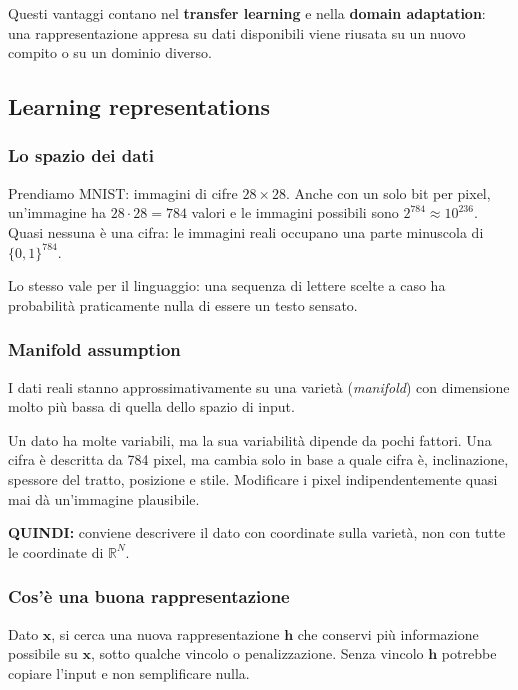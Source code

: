 \documentclass[11pt,a4paper]{article}
\begin{document}
Questi vantaggi contano nel \textbf{transfer learning} e nella
\textbf{domain adaptation}: una rappresentazione appresa su dati disponibili
viene riusata su un nuovo compito o su un dominio diverso.

\subsection{Learning representations}

\subsubsection{Lo spazio dei dati}
Prendiamo MNIST: immagini di cifre $28\times 28$. Anche con un solo bit per
pixel, un'immagine ha $28\cdot 28=784$ valori e le immagini possibili sono
$2^{784}\approx 10^{236}$. Quasi nessuna è una cifra: le immagini reali
occupano una parte minuscola di $\{0,1\}^{784}$.

Lo stesso vale per il linguaggio: una sequenza di lettere scelte a caso ha
probabilità praticamente nulla di essere un testo sensato.

\subsubsection{Manifold assumption}
\begin{definizione}
I dati reali stanno approssimativamente su una varietà (\emph{manifold}) con
dimensione molto più bassa di quella dello spazio di input.
\end{definizione}

Un dato ha molte variabili, ma la sua variabilità dipende da pochi fattori.
Una cifra è descritta da 784 pixel, ma cambia solo in base a quale cifra è,
inclinazione, spessore del tratto, posizione e stile. Modificare i pixel
indipendentemente quasi mai dà un'immagine plausibile.

\textbf{QUINDI:} conviene descrivere il dato con coordinate sulla varietà, non
con tutte le coordinate di $\mathbb{R}^{N}$.

\subsubsection{Cos'è una buona rappresentazione}
Dato $\mathbf{x}$, si cerca una nuova rappresentazione $\mathbf{h}$ che
conservi più informazione possibile su $\mathbf{x}$, sotto qualche vincolo o
penalizzazione. Senza vincolo $\mathbf{h}$ potrebbe copiare l'input e non
semplificare nulla.
\end{document}
